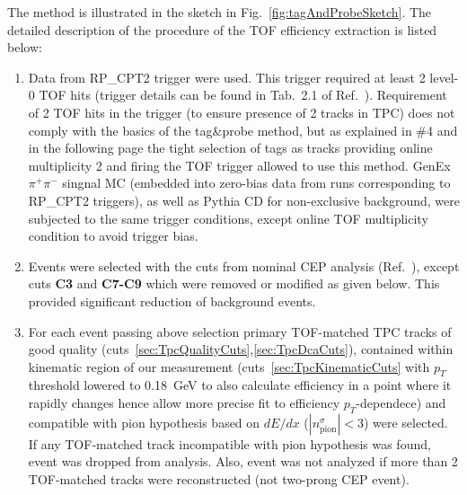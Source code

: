 The method is illustrated in the sketch in Fig.~\ref{fig:tagAndProbeSketch}. The detailed description of the procedure of the TOF efficiency extraction is listed below:
%
%
%
%
%
%
\begin{enumerate}
 \item Data from RP\_CPT2 trigger were used. This trigger required at least 2 level-0 TOF hits (trigger details can be found in Tab.~2.1 of Ref.~\cite{AnalysisNoteRafal}). Requirement of 2 TOF hits in the trigger (to ensure presence of 2 tracks in TPC) does not comply with the basics of the tag\&probe method, but as explained in \#4 and in the following page the tight selection of tags as tracks providing online multiplicity 2 and firing the TOF trigger allowed to use this method. GenEx $\pi^{+}\pi^{-}$ singnal MC (embedded into zero-bias data from runs corresponding to RP\_CPT2 triggers), as well as Pythia CD for non-exclusive background, were subjected to the same trigger conditions, except online TOF multiplicity condition to avoid trigger bias.\\[-20pt]%
 \item Events were selected with the cuts from nominal CEP analysis (Ref.~\cite{AnalysisNoteRafal}), except cuts \textbf{C3} and \textbf{C7-C9} which were removed or modified as given below. This provided significant reduction of background events.\\[-20pt]%
 \item For each event passing above selection primary TOF-matched TPC tracks of good quality (cuts~\ref{sec:TpcQualityCuts},\ref{sec:TpcDcaCuts}), contained within kinematic region of our measurement (cuts~\ref{sec:TpcKinematicCuts} with $p_{T}$ threshold lowered to 0.18~GeV to also calculate efficiency in a point where it rapidly changes hence allow more precise fit to efficiency $p_{T}$-dependece) and compatible with pion hypothesis based on $dE/dx$ ($|n^{\sigma}_{\text{pion}}|<3$) were selected. If any TOF-matched track incompatible with pion hypothesis was found, event was dropped from analysis. Also, event was not analyzed if more than 2 TOF-matched tracks were reconstructed (not two-prong CEP event).\\[-20pt]%

\end{enumerate}
